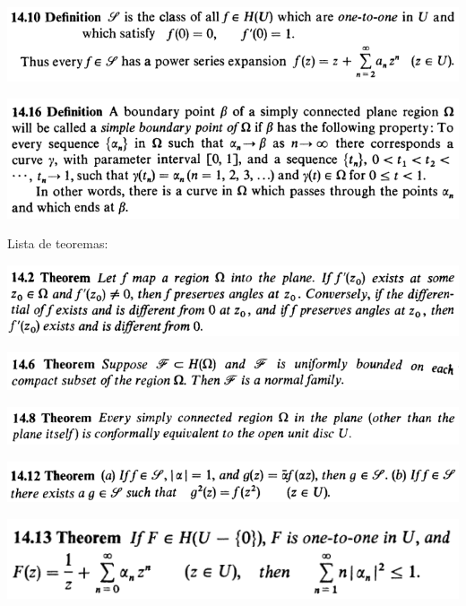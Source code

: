 \documentclass[12pt]{article}
\begin{document}
		\begin{center}
		\includegraphics{d14ponto10}
		\end{center}

		\begin{center}
		\includegraphics{d14ponto16}
		\end{center}

Lista de teoremas:

		\begin{center}
		\includegraphics{14ponto2}
		\end{center}

		\begin{center}
		\includegraphics{14ponto6}
		\end{center}

		\begin{center}
		\includegraphics{14ponto8}
		\end{center}

		\begin{center}
		\includegraphics{14ponto12}
		\end{center}

		\begin{center}
		\includegraphics{14ponto13}
		\end{center}
\end{document}
